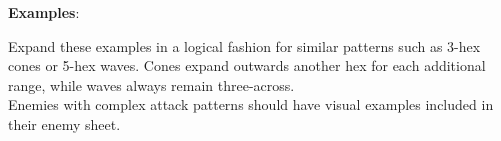 \documentclass[12pt]{article}
\begin{document}
\begin{multicols*}{2}
\textbf{Examples}:
\begin{center}
\end{center}
Expand these examples in a logical fashion for similar patterns such as 3-hex cones or 5-hex waves. Cones expand outwards another hex for each additional range, while waves always remain three-across.\\
Enemies with complex attack patterns should have visual examples included in their enemy sheet.\\


\end{multicols*}
\end{document}

